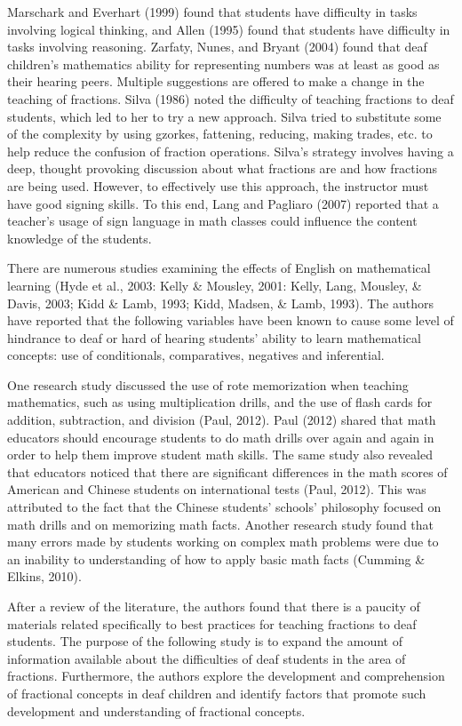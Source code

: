 \documentclass[11.5pt]{sig-alternate} %
\begin{document}
\begin{large}
Marschark and Everhart (1999) found that students have difficulty in tasks involving logical thinking, and Allen (1995) found that students have difficulty in tasks involving reasoning. Zar\-faty, Nunes, and Bryant (2004) found that deaf children's mathematics ability for representing numbers was at least as good as their hearing peers. Multiple suggestions are offered to make a change in the teaching of fractions. Silva (1986) noted the difficulty of teaching fractions to deaf students, which led to her to try a new approach. Silva tried to substitute some of the complexity by using gzorkes, fattening, reducing, making trades, etc. to help reduce the confusion of fraction operations. Silva’s strategy involves having a deep, thought provoking discussion about what fractions are and how fractions are being used. However, to effectively use this approach, the instructor must have good signing skills. To this end, Lang and Pagliaro (2007) reported that a teacher's usage of sign language in math classes could influence the content knowledge of the students.

There are numerous studies examining the effects of English on mathematical learning (Hyde et al., 2003: Kelly \& Mousley, 2001: Kelly, Lang, Mousley, \& Davis, 2003; Kidd \& Lamb, 1993; Kidd, Madsen, \& Lamb, 1993). The authors have reported that the following variables have been known to cause some level of hindrance to deaf or hard of hearing students’ ability to learn mathematical concepts: use of conditionals, comparatives, negatives and inferential.
 
One research study discussed the use of rote memorization when teaching mathematics, such as using multiplication drills, and the use of flash cards for addition, subtraction, and division (Paul, 2012). Paul (2012) shared that math educators should encourage students to do math drills over again and again in order to help them improve student math skills. The same study also revealed that educators noticed that there are significant differences in the math scores of American and Chinese students on international tests (Paul, 2012). This was attributed to the fact that the Chinese students’ schools’ philosophy focused on math drills and on memorizing math facts. Another research study found that many errors made by students working on complex math problems were due to an inability to understanding of how to apply basic math facts (Cumming \& Elkins, 2010).

After a review of the literature, the authors found that there is a paucity of materials related specifically to best practices for teaching fractions to deaf students. The purpose of the following study is to expand the amount of information available about the difficulties of deaf students in the area of fractions. Furthermore, the authors explore the development and comprehension of fractional concepts in deaf children and identify factors that promote such development and understanding of fractional concepts.


\end{large}
\end{document}
